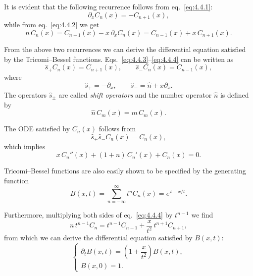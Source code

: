 It is evident that the following recurrence follows from eq.~\eqref{eq:4.4.1}:
\begin{equation}
\partial_x C_n(x) = -C_{n+1}(x),
\label{eq:4.4.3}
\end{equation}
while from eq.~\eqref{eq:4.4.2} we get
\begin{equation}
n\,C_n(x) = C_{n-1}(x) - x\,\partial_x C_n(x)
= C_{n-1}(x) + x\,C_{n+1}(x).
\label{eq:4.4.4}
\end{equation}

From the above two recurrences we can derive the differential equation
satisfied by the Tricomi--Bessel functions. Eqs.~\eqref{eq:4.4.3}--\eqref{eq:4.4.4}
can be written as
\begin{equation}
\hat s_+ C_n(x) = C_{n+1}(x),
\qquad
\hat s_- C_n(x) = C_{n-1}(x),
\label{eq:4.4.5}
\end{equation}
where
\begin{equation}
\hat s_+ = -\partial_x,
\qquad
\hat s_- = \hat n + x\partial_x.
\label{eq:4.4.6}
\end{equation}
The operators $\hat s_\pm$ are called \emph{shift operators} and the number
operator $\hat n$ is defined by
\begin{equation}
\hat n\,C_m(x) = m\,C_m(x).
\label{eq:4.4.7}
\end{equation}

The ODE satisfied by $C_n(x)$ follows from
\begin{equation}
\hat s_+ \hat s_- C_n(x) = C_n(x),
\label{eq:4.4.8}
\end{equation}
which implies
\begin{equation}
x\,C_n''(x) + (1+n)\,C_n'(x) + C_n(x) = 0.
\label{eq:4.4.9}
\end{equation}

Tricomi--Bessel functions are also easily shown to be specified by the
generating function
\begin{equation}
B(x,t) = \sum_{n=-\infty}^{\infty} t^n C_n(x)
= e^{\,t - x/t}.
\label{eq:4.4.10}
\end{equation}

Furthermore, multiplying both sides of eq.~\eqref{eq:4.4.4} by $t^{n-1}$
we find
\begin{equation}
n\,t^{n-1} C_n = t^{n-1} C_{n-1} + \frac{x}{t^2}\,t^{n+1} C_{n+1},
\label{eq:4.4.11}
\end{equation}
from which we can derive the differential equation satisfied by $B(x,t)$:
\begin{equation}
\begin{cases}
\partial_t B(x,t) = \left(1 + \dfrac{x}{t^2}\right) B(x,t),\\[4pt]
B(x,0) = 1.
\end{cases}
\label{eq:4.4.12}
\end{equation}

